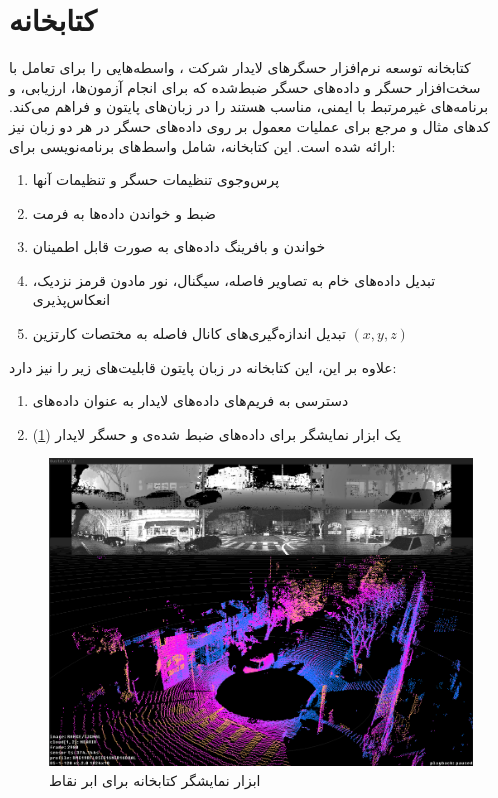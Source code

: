 \section{کتابخانه }
کتابخانه توسعه نرم‌افزار حسگرهای لایدار شرکت ، واسطه‌هایی را برای تعامل با سخت‌افزار حسگر و داده‌های حسگر ضبط‌شده که برای انجام آزمون‌ها، ارزیابی، و برنامه‌های غیرمرتبط با ایمنی، مناسب هستند را در زبان‌های پایتون و  فراهم می‌کند. کدهای مثال و مرجع برای عملیات معمول بر روی داده‌های حسگر در هر دو زبان نیز ارائه شده است. این کتابخانه، شامل واسط‌های برنامه‌نویسی برای:
\begin{enumerate}
    \item پرس‌‌وجوی تنظیمات حسگر و تنظیمات آنها
    \item ضبط و خواندن داده‌ها به فرمت 
    \item خواندن و بافرینگ داده‌های  به صورت قابل اطمینان
    \item تبدیل داده‌های خام به تصاویر فاصله، سیگنال، نور مادون قرمز نزدیک، انعکاس‌پذیری
    \item  تبدیل اندازه‌گیری‌های کانال فاصله به مختصات کارتزین $(x, y, z)$
\end{enumerate}
علاوه بر این، این کتابخانه در زبان پایتون قابلیت‌های زیر را نیز دارد:
\begin{enumerate}
    \item دسترسی به فریم‌های داده‌های لایدار به عنوان داده‌های 
    \item یک ابزار نمایشگر برای داده‌های ضبط شده‌ی  و حسگر لایدار \cite{OusterSDK:Documentation} (\cref{fig:OusterSDK_Visualizer})
\end{enumerate}

\begin{figure}[h!]
    \centering
    \includegraphics[width=1\linewidth]{figures/OusterSDK_Visualizer.png}
    \caption{ابزار نمایشگر کتابخانه  برای ابر نقاط \cite{OusterSDK:Documentation}}
    \label{fig:OusterSDK_Visualizer}
\end{figure}

